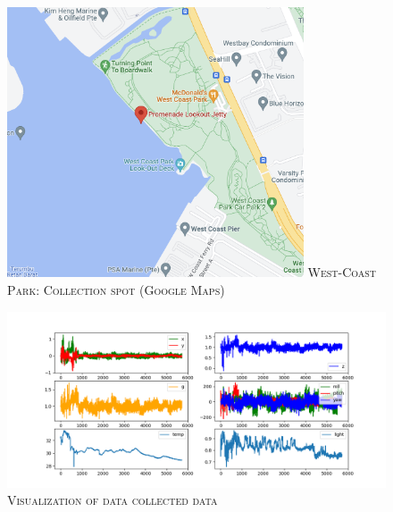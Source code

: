 \documentclass{article}
\begin{document}
\begin{multicols}{2}
\begin{figure}[H]
    \centering
     \includegraphics[height=8cm]{report/images/datacollection_location.png}
    \textsc{West-Coast Park: Collection spot (Google Maps)}
\end{figure}

\end{multicols}

\begin{figure}[H]
    \centering
    \includegraphics[width=\textwidth]{report/images/good_data.png}
    \textsc{Visualization of data collected data}
    \label{fig:my_label}
\end{figure}
\end{document}

